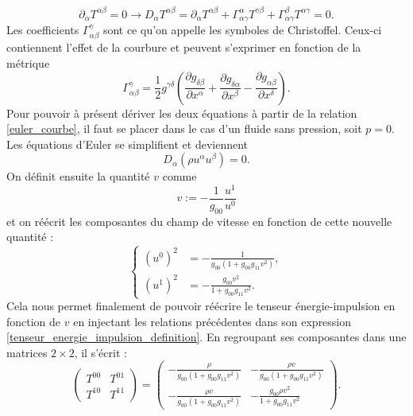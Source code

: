 \documentclass[11pt,a4paper]{article}
\begin{document}
\begin{equation}\label{euler_courbe}
	\partial_\alpha T^{\alpha\beta} = 0 \rightarrow D_\alpha T^{\alpha\beta} = \partial_\alpha T^{\alpha\beta}
	+ \Gamma^\alpha_{\alpha\gamma} T^{\gamma\beta}
	+ \Gamma^\beta_{\alpha\gamma} T^{\alpha\gamma} = 0.
\end{equation}
Les coefficients $\Gamma^\gamma_{\alpha\beta}$ sont ce qu'on appelle les symboles de Christoffel. Ceux-ci contiennent l'effet de la courbure et peuvent s'exprimer en fonction de la métrique \cite{weinberg1972gravitation}
\begin{equation}
	\Gamma^{\gamma}_{\alpha\beta} = {\frac{1}{2}}g^{\gamma \delta}\left({\frac {\partial g_{\delta\beta}}{\partial x^{\alpha}}}+{\frac {\partial g_{\delta\alpha}}{\partial x^{\beta}}}-{\frac{\partial g_{\alpha\beta}}{\partial x^{\delta}}}\right).
\end{equation}
Pour pouvoir à présent dériver les deux équations à partir de la relation \eqref{euler_courbe}, il faut se placer dans le cas d'un fluide sans pression, soit $p=0$. Les équations d'Euler se simplifient et deviennent
\begin{equation}
	D_\alpha \left(\rho u^\alpha u^\beta\right) = 0.
\end{equation}
On définit ensuite la quantité $v$ comme
\begin{equation}\label{definition_v}
	v := - \frac{1}{g_{00}} \frac{u^1}{u^0}
\end{equation}
et on réécrit les composantes du champ de vitesse en fonction de cette nouvelle quantité :
\begin{equation}
  \left\{
      \begin{aligned}
        (u^0)^2 & = -\frac{1}{g_{00}(1+g_{00}g_{11}v^2)},\\
        (u^1)^2 & = -\frac{g_{00}v^2}{1+g_{00}g_{11}v^2}.
      \end{aligned}
    \right.
\end{equation}
Cela nous permet finalement de pouvoir réécrire le tenseur énergie-impulsion en fonction de $v$ en injectant les relations précédentes dans son expression \eqref{tenseur_energie_impulsion_definition}. En regroupant ses composantes dans une matrices $2\times 2$, il s'écrit :
\begin{equation}
\begin{pmatrix}\label{tenseur_energie_impulsion}
	T^{00} & T^{01} \\
	T^{10} & T^{11} 
\end{pmatrix}
=
\begin{pmatrix}
	-\frac{\rho}{g_{00}(1+g_{00}g_{11}v^2)}   & -\frac{\rho v}{g_{00}(1+g_{00}g_{11}v^2)} \\
	-\frac{\rho v}{g_{00}(1+g_{00}g_{11}v^2)} & -\frac{g_{00}\rho v^2}{1+g_{00}g_{11}v^2}
\end{pmatrix}.
\end{equation}
\end{document}
